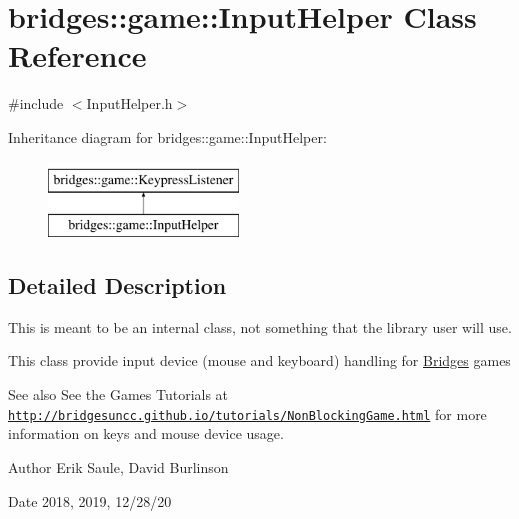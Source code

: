 \hypertarget{classbridges_1_1game_1_1_input_helper}{}\section{bridges\+:\+:game\+:\+:Input\+Helper Class Reference}
\label{classbridges_1_1game_1_1_input_helper}


{\ttfamily \#include $<$Input\+Helper.\+h$>$}

Inheritance diagram for bridges\+:\+:game\+:\+:Input\+Helper\+:\begin{figure}[H]
\begin{center}
\leavevmode
\includegraphics[height=2.000000cm]{classbridges_1_1game_1_1_input_helper}
\end{center}
\end{figure}


\subsection{Detailed Description}
This is meant to be an internal class, not something that the library user will use. 

This class provide input device (mouse and keyboard) handling for \hyperlink{classbridges_1_1_bridges}{Bridges} games

\begin{DoxySeeAlso}{See also}
See the Games Tutorials at \href{http://bridgesuncc.github.io/tutorials/NonBlockingGame.html}{\tt http\+://bridgesuncc.\+github.\+io/tutorials/\+Non\+Blocking\+Game.\+html} for more information on keys and mouse device usage.
\end{DoxySeeAlso}
\begin{DoxyAuthor}{Author}
Erik Saule, David Burlinson 
\end{DoxyAuthor}
\begin{DoxyDate}{Date}
2018, 2019, 12/28/20 
\end{DoxyDate}
